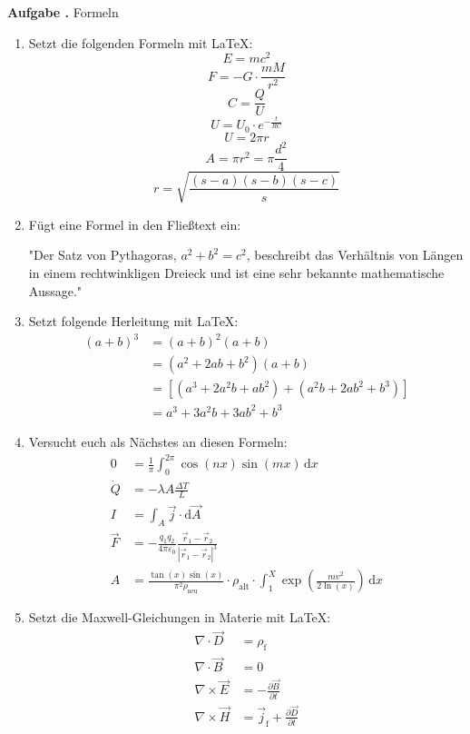 \documentclass[a4paper, 12pt, headsepline, pagesize, parskip=half-, headlines=3.1]{scrartcl}
\newcounter{aufgabe}
\newenvironment{aufgabe}[1][]{\stepcounter{aufgabe}
\noindent\textbf{Aufgabe \arabic{aufgabe}.} #1\par
\begin{enumerate}[label=\alph*)]}{\end{enumerate}\bigskip}
\begin{document}
\begin{aufgabe}[Formeln]
	\item Setzt die folgenden Formeln mit \LaTeX:
	\begin{equation}
		E = mc^2
	\end{equation}	
	\begin{equation}
		\label{eq:newton}
		F = -G ⋅ \frac{mM}{r^2}
	\end{equation}	
	\begin{equation}
		C = \frac{Q}{U}
	\end{equation}	
	\begin{equation}
		U = U_0 ⋅ e^{-\frac{t}{RC}}
	\end{equation}	
	\begin{equation}
		\label{eq:circle_circumference}
		U = 2πr
	\end{equation}
	\begin{equation}\label{eq:circle_area}
		A = πr^2 = π\frac{d^2}{4}
	\end{equation}
	\begin{equation}
		r = \sqrt{\frac{(s-a)(s-b)(s-c)}{s}}
	\end{equation}
	\item Fügt eine Formel in den Fließtext ein:
	
	"Der Satz von Pythagoras, $a^2 + b^2 = c^2$, beschreibt das Verhältnis von Längen in einem rechtwinkligen Dreieck und ist eine sehr bekannte mathematische Aussage."
	\item Setzt folgende Herleitung mit \LaTeX:
	\begin{align*}
		(a + b)^3
		&= (a + b)^2 (a + b) \\
		&= (a^2 + 2ab + b^2) (a + b) \\
		&= \left[(a^3 + 2 a^2 b + a b^2) + (a^2 b + 2 a b^2 + b^3)\right] \\
		&= a^3 + 3 a^2 b + 3 a b^2 + b^3
	\end{align*}
	\item Versucht euch als Nächstes an diesen Formeln:
	\begin{align*}
		0 &= \frac{1}{π} ∫_0^{2π} \cos(nx) \sin(mx) \, \mathrm{d}x\\
		\dot{Q} &= - λA \frac{ΔT}{L}\\
		I &= ∫_A \vec{j} ⋅ \mathrm{d}\vec{A}\\
		\vec{F} &= - \frac{q_1 q_2}{4πε_0} \frac{\vec{r}_1 - \vec{r}_2}{|\vec{r}_1 - \vec{r}_2|^3} \\
		A &= \frac{\tan(x) \sin(x)}{π^2 ρ_{\text{neu}}} ⋅ ρ_{\text{alt}} ⋅ ∫_1^X \exp\!\left(\frac{m v^2}{2\ln(x)}\right) \, \mathrm{d}x
	\end{align*}
	\item Setzt die Maxwell-Gleichungen in Materie mit \LaTeX:
	\begin{align}
		\label{eq:max1}
		∇ ⋅ \vec{D} &= ρ_\text{f} \\
		∇ ⋅ \vec{B} &= 0 \\
		∇ × \vec{E} &= -\frac{∂\vec{B}}{∂t} \\
		\label{eq:max4}
		∇ × \vec{H} &= \vec{j}_\text{f} + \frac{∂\vec{D}}{∂t}
	\end{align}
	

\end{aufgabe}
\end{document}
